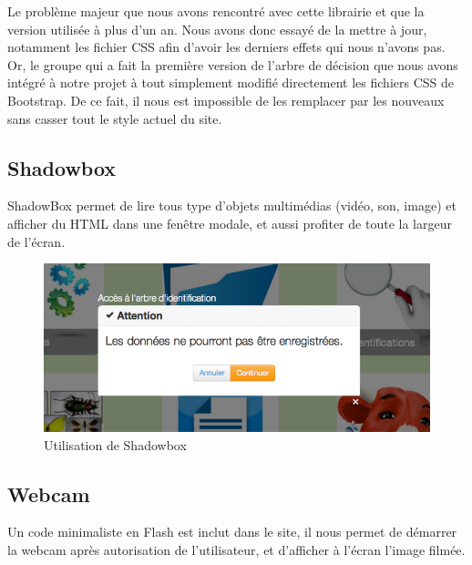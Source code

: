 \documentclass[twoside]{EPURapport}
\begin{document}
		Le problème majeur que nous avons rencontré avec cette librairie et que la version utilisée à plus d'un an. Nous avons donc essayé de la mettre à jour, notamment les fichier CSS afin d'avoir les derniers effets qui nous n'avons pas. Or, le groupe qui a fait la première version de l'arbre de décision que nous avons intégré à notre projet à tout simplement modifié directement les fichiers CSS de Bootstrap. De ce fait, il nous est impossible de les remplacer par les nouveaux sans casser tout le style actuel du site.
		
		\subsection{Shadowbox}
		\label{lib:shadowbox}
		ShadowBox permet de lire tous type d'objets multimédias (vidéo, son, image) et afficher du HTML dans une fenêtre modale, et aussi profiter de toute la largeur de l'écran.
		
		\begin{figure}[hbtp]
			\centering
			\includegraphics[scale=0.5]{images/lib-shadowbox.png}
			\caption{Utilisation de Shadowbox}
		\end{figure}
		
		\subsection{Webcam}
		\label{lib:webcam}
		Un code minimaliste en Flash est inclut dans le site, il nous permet de démarrer la webcam après autorisation de l'utilisateur, et d'afficher à l'écran l'image filmée.
		
\end{document}
